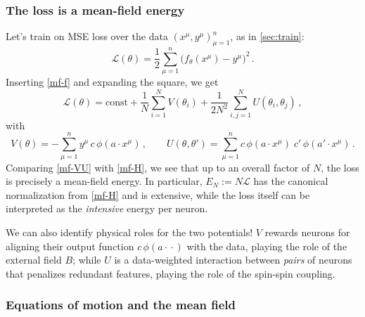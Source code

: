 \documentclass[11pt]{article}
\newcommand{\CL}{{\mathcal L}}
\begin{document}
\subsubsection{The loss is a mean-field energy}

Let's train on MSE loss over the data $(x^\mu,y^\mu)_{\mu=1}^n$, as in \cref{sec:train}:
%
\begin{equation}
    \CL(\theta) = \frac{1}{2}\sum_{\mu=1}^n \big(f_\theta(x^\mu)-y^\mu\big)^2\,.
\end{equation}
%
Inserting \eqref{mf-f} and expanding the square, we get
%
\begin{equation} \label{mf-VU}
    \CL(\theta) = \text{const} + \frac{1}{N}\sum_{i=1}^N V(\theta_i) + \frac{1}{2N^2}\sum_{i,j=1}^N U(\theta_i,\theta_j)\,,
\end{equation}
%
with
%
\begin{equation} \label{mf-VU-def}
    V(\theta) = -\sum_{\mu=1}^n y^\mu\, c\,\phi(a\cdot x^\mu)\,,\qquad
    U(\theta,\theta') = \sum_{\mu=1}^n c\,\phi(a\cdot x^\mu)\; c'\,\phi(a'\cdot x^\mu)\,.
\end{equation}
%
Comparing \eqref{mf-VU} with \eqref{mf-H}, we see that up to an overall factor of $N$, the loss is precisely a mean-field energy. In particular, $E_N:=N\CL$ has the canonical normalization from \eqref{mf-H} and is extensive, while the loss itself can be interpreted as the \emph{intensive} energy per neuron.

We can also identify physical roles for the two potentials! 
$V$ rewards neurons for aligning their output function $c\,\phi(a\cdot{}\cdot)$ with the data, playing the role of the external field $B$; while $U$ is a data-weighted interaction between \emph{pairs} of neurons that penalizes redundant features, playing the role of the spin-spin coupling.

\subsubsection{Equations of motion and the mean field}
\end{document}
